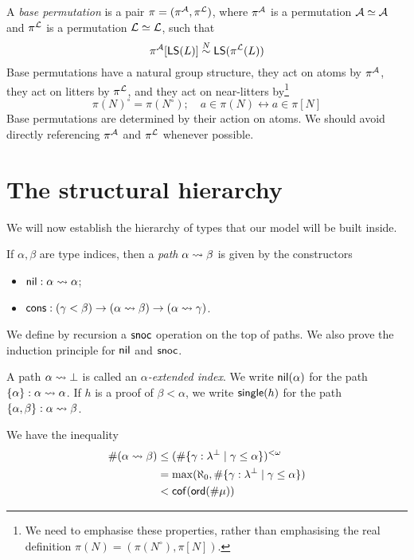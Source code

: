 \begin{definition}
  \label{def:BasePerm}
  A \emph{base permutation} is a pair \( \pi = (\pi^{\mathcal A}, \pi^{\mathcal L}) \), where \( \pi^{\mathcal A} \) is a permutation \( {\mathcal A} \simeq {\mathcal A} \) and \( \pi^{\mathcal L} \) is a permutation \( {\mathcal L} \simeq {\mathcal L} \), such that
  \[ \pi^{\mathcal A}[\operatorname{\mathsf{LS}}(L)] \mathrel{\overset{N}{\sim}} \operatorname{\mathsf{LS}}(\pi^{\mathcal L}(L)) \]
  Base permutations have a natural group structure, they act on atoms by \( \pi^{\mathcal A} \), they act on litters by \( \pi^{\mathcal L} \), and they act on near-litters by\footnote{We need to emphasise these properties, rather than emphasising the real definition \( \pi(N) = (\pi(N^\circ), \pi[N]) \).}
  \[ \pi(N)^\circ = \pi(N^\circ);\quad a \in \pi(N) \leftrightarrow a \in \pi[N] \]
  Base permutations are determined by their action on atoms.
  We should avoid directly referencing \( \pi^{\mathcal A} \) and \( \pi^{\mathcal L} \) whenever possible.
\end{definition}

\section{The structural hierarchy}

We will now establish the hierarchy of types that our model will be built inside.

\begin{definition}[path]
  \label{def:Path}
  If \( \alpha, \beta \) are type indices, then a \emph{path} \( \alpha \rightsquigarrow \beta \) is given by the constructors
  \begin{itemize}
    \item \( \operatorname{\mathsf{nil}} : \alpha \rightsquigarrow \alpha \);
    \item \( \operatorname{\mathsf{cons}} : (\gamma < \beta) \to (\alpha \rightsquigarrow \beta) \to (\alpha \rightsquigarrow \gamma) \).
  \end{itemize}
  We define by recursion a \( \operatorname{\mathsf{snoc}} \) operation on the top of paths.
  We also prove the induction principle for \( \operatorname{\mathsf{nil}} \) and \( \operatorname{\mathsf{snoc}} \).

  A path \( \alpha \rightsquigarrow \bot \) is called an \emph{\( \alpha \)-extended index}.
  We write \( \operatorname{\mathsf{nil}}(\alpha) \) for the path \( \{ \alpha \} : \alpha \rightsquigarrow \alpha \).
  If \( h \) is a proof of \( \beta < \alpha \), we write \( \operatorname{\mathsf{single}}(h) \) for the path \( \{ \alpha, \beta \} : \alpha \rightsquigarrow \beta \).

  We have the inequality
  \begin{align*}
    \#(\alpha \rightsquigarrow \beta)
    &\leq (\#\{ \gamma : \lambda^\bot \mid \gamma \leq \alpha \})^{<\omega} \\
    &= \max(\aleph_0, \#\{ \gamma : \lambda^\bot \mid \gamma \leq \alpha \}) \\
    &< \operatorname{\mathsf{cof}}(\operatorname{\mathsf{ord}}(\#\mu))
  \end{align*}
\end{definition}

